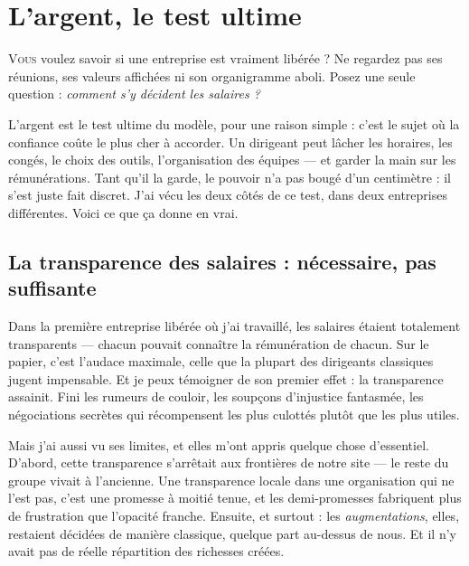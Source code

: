 
\chapter{L'argent, le test ultime}

\lettrine[lines=2]{V}{ous} voulez savoir si une entreprise est vraiment libérée ? Ne regardez pas ses réunions, ses valeurs affichées ni son organigramme aboli. Posez une seule question : \emph{comment s'y décident les salaires ?}

L'argent est le test ultime du modèle, pour une raison simple : c'est le sujet où la confiance coûte le plus cher à accorder. Un dirigeant peut lâcher les horaires, les congés, le choix des outils, l'organisation des équipes — et garder la main sur les rémunérations. Tant qu'il la garde, le pouvoir n'a pas bougé d'un centimètre : il s'est juste fait discret. J'ai vécu les deux côtés de ce test, dans deux entreprises différentes. Voici ce que ça donne en vrai.

\section{La transparence des salaires : nécessaire, pas suffisante}

Dans la première entreprise libérée où j'ai travaillé, les salaires étaient totalement transparents — chacun pouvait connaître la rémunération de chacun. Sur le papier, c'est l'audace maximale, celle que la plupart des dirigeants classiques jugent impensable. Et je peux témoigner de son premier effet : la transparence assainit. Fini les rumeurs de couloir, les soupçons d'injustice fantasmée, les négociations secrètes qui récompensent les plus culottés plutôt que les plus utiles.

Mais j'ai aussi vu ses limites, et elles m'ont appris quelque chose d'essentiel. D'abord, cette transparence s'arrêtait aux frontières de notre site — le reste du groupe vivait à l'ancienne. Une transparence locale dans une organisation qui ne l'est pas, c'est une promesse à moitié tenue, et les demi-promesses fabriquent plus de frustration que l'opacité franche. Ensuite, et surtout : les \emph{augmentations}, elles, restaient décidées de manière classique, quelque part au-dessus de nous. Et il n'y avait pas de réelle répartition des richesses créées.

